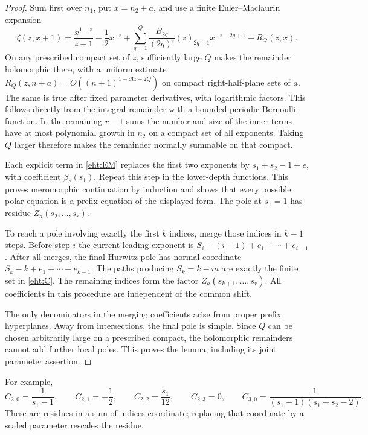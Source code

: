 \documentclass[11pt]{article}
\numberwithin{equation}{section}
\theoremstyle{plain}
\theoremstyle{definition}
\theoremstyle{remark}
\begin{document}
\begin{proof}
Sum first over $n_1$, put $x=n_2+a$, and use a finite
Euler--Maclaurin expansion
\begin{equation}\label{eht:EM}
 \zeta(z,x+1)=\frac{x^{1-z}}{z-1}-\frac12x^{-z}
    +\sum_{q=1}^Q\frac{B_{2q}}{(2q)!}(z)_{2q-1}x^{-z-2q+1}
    +R_Q(z,x).
\end{equation}
On any prescribed compact set of $z$, sufficiently large $Q$ makes the
remainder holomorphic there, with a uniform estimate
$R_Q(z,n+a)=O((n+1)^{1-\Re z-2Q})$ on compact right-half-plane sets of
$a$.  The same is true after fixed parameter derivatives, with logarithmic
factors.  This follows directly from the integral remainder with a bounded
periodic Bernoulli function.  In the remaining $r-1$ sums the number and
size of the inner terms have at most polynomial growth in $n_2$ on a
compact set of all exponents.  Taking $Q$ larger therefore makes the
remainder normally summable on that compact.

Each explicit term in \eqref{eht:EM} replaces the first two exponents by
$s_1+s_2-1+e$, with coefficient $\beta_e(s_1)$.  Repeat this step in the
lower-depth functions.  This proves meromorphic continuation by induction
and shows that every possible polar equation is a prefix equation of the
displayed form.  The pole at $s_1=1$ has residue
$Z_a(s_2,\ldots,s_r)$.

To reach a pole involving exactly the first $k$ indices, merge those
indices in $k-1$ steps.  Before step $i$ the current leading exponent is
$S_i-(i-1)+e_1+\cdots+e_{i-1}$.  After all merges, the final Hurwitz pole
has normal coordinate
$S_k-k+e_1+\cdots+e_{k-1}$.  The paths producing $S_k=k-m$ are exactly
the finite set in \eqref{eht:C}.  The remaining indices form the factor
$Z_a(s_{k+1},\ldots,s_r)$.  All coefficients in this procedure are
independent of the common shift.

The only denominators in the merging coefficients arise from proper
prefix hyperplanes.  Away from intersections, the final pole is simple.
Since $Q$ can be chosen arbitrarily large on a prescribed compact, the
holomorphic remainders cannot add further local poles.  This proves the
lemma, including its joint parameter assertion.
\end{proof}

For example,
\[
 C_{2,0}=\frac1{s_1-1},\qquad C_{2,1}=-\frac12,
 \qquad C_{2,2}=\frac{s_1}{12},\qquad C_{2,3}=0,
 \qquad C_{3,0}=\frac1{(s_1-1)(s_1+s_2-2)}.
\]
These are residues in a sum-of-indices coordinate; replacing that
coordinate by a scaled parameter rescales the residue.
\end{document}
